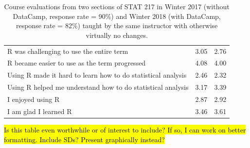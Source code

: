 \documentclass{tise_style_doi}
\begin{document}
\begin{table}
{\begin{tabular}{lcc}
R was challenging to use the entire term	                    &	3.05	&	2.76	\\
R became easier to use as the term progressed	                &	4.08	&	4.00	\\
Using R made it hard to learn how to do statistical analysis	&	2.46	&	2.32	\\
Using R helped me understand how to do statistical analysis	    &	3.17	&	3.39	\\
I enjoyed using R	                                            &	2.87	&	2.92	\\
I am glad I learned R	                                        &	3.46	&	3.61	\\
\bottomrule
\end{tabular}}
\caption{Course evaluations from two sections of STAT 217 in Winter 2017 (without DataCamp, response rate = 90\%) 
and Winter 2018 (with DataCamp, response rate = 82\%) taught
by the same instructor with otherwise virtually no changes.}
\label{tab:evals}
\end{table}

\hl{Is this table even worthwhile or of interest to include?  If so, I can work on better formatting.  Include
SDs?  Present graphically instead?}




\end{document}

